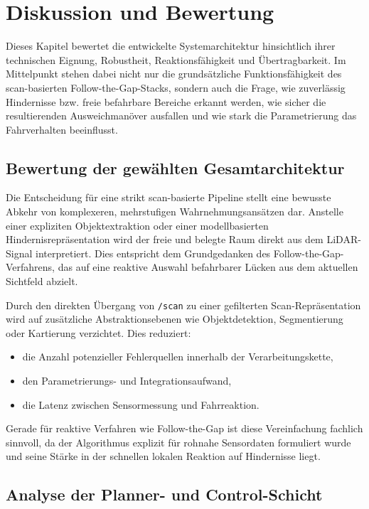 \chapter{Diskussion und Bewertung}
\label{ch:diskussion}

Dieses Kapitel bewertet die entwickelte Systemarchitektur hinsichtlich ihrer technischen Eignung, Robustheit, Reaktionsfähigkeit und Übertragbarkeit. Im Mittelpunkt stehen dabei nicht nur die grundsätzliche Funktionsfähigkeit des scan-basierten Follow-the-Gap-Stacks, sondern auch die Frage, wie zuverlässig Hindernisse bzw. freie befahrbare Bereiche erkannt werden, wie sicher die resultierenden Ausweichmanöver ausfallen und wie stark die Parametrierung das Fahrverhalten beeinflusst.

\section{Bewertung der gewählten Gesamtarchitektur}

Die Entscheidung für eine strikt scan-basierte Pipeline stellt eine bewusste Abkehr von komplexeren, mehrstufigen Wahrnehmungsansätzen dar. Anstelle einer expliziten Objektextraktion oder einer modellbasierten Hindernisrepräsentation wird der freie und belegte Raum direkt aus dem LiDAR-Signal interpretiert. Dies entspricht dem Grundgedanken des Follow-the-Gap-Verfahrens, das auf eine reaktive Auswahl befahrbarer Lücken aus dem aktuellen Sichtfeld abzielt.

Durch den direkten Übergang von \texttt{/scan} zu einer gefilterten Scan-Repräsentation wird auf zusätzliche Abstraktionsebenen wie Objektdetektion, Segmentierung oder Kartierung verzichtet. Dies reduziert:

\begin{itemize}
    \item die Anzahl potenzieller Fehlerquellen innerhalb der Verarbeitungskette,
    \item den Parametrierungs- und Integrationsaufwand,
    \item die Latenz zwischen Sensormessung und Fahrreaktion.
\end{itemize}

Gerade für reaktive Verfahren wie Follow-the-Gap ist diese Vereinfachung fachlich sinnvoll, da der Algorithmus explizit für rohnahe Sensordaten formuliert wurde und seine Stärke in der schnellen lokalen Reaktion auf Hindernisse liegt.


\section{Analyse der Planner- und Control-Schicht}

